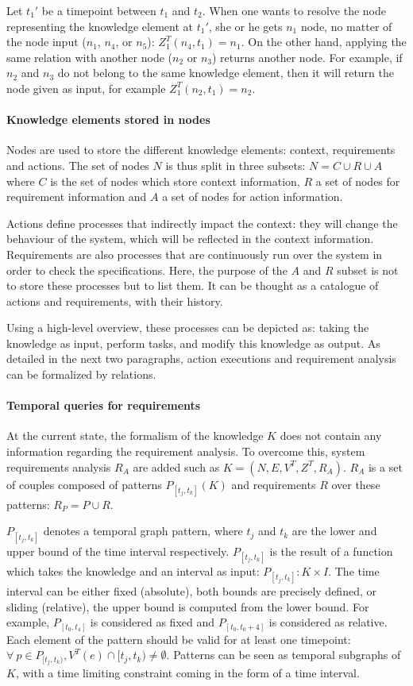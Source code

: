 Let $t_1'$ be a timepoint between $t_1$ and $t_2$.
When one wants to resolve the node representing the knowledge element at $t_1'$, she or he gets $n_1$ node, no matter of the node input ($n_1$, $n_4$, or $n_5$): $Z^{T}_1(n_4, t_1) = n_1$.
On the other hand, applying the same relation with another node ($n_2$ or $n_3$) returns another node.
For example, if $n_2$ and $n_3$ do not belong to the same knowledge element, then it will return the node given as input, for example $Z^{T}_1(n_2, t_1) = n_2$.

\paragraph{Knowledge elements stored in nodes}
Nodes are used to store the different knowledge elements: context, requirements and actions.
The set of nodes $N$ is thus split in three subsets: $N = C \cup R \cup A$ where $C$ is the set of nodes which store context information, $R$ a set of nodes for requirement information and $A$ a set of nodes for action information.

Actions define processes that indirectly impact the context: they will change the behaviour of the system, which will be reflected in the context information.
Requirements are also processes that are continuously run over the system in order to check the specifications.
Here, the purpose of the $A$ and $R$ subset is not to store these processes but to list them.
It can be thought as a catalogue of actions and requirements, with their history.

Using a high-level overview, these processes can be depicted as: taking the knowledge as input, perform tasks, and modify this knowledge as output.
As detailed in the next two paragraphs, action executions and requirement analysis can be formalized by relations.

\paragraph{Temporal queries for requirements}
At the current state, the formalism of the knowledge $K$ does not contain any information regarding the requirement analysis.
To overcome this, system requirements analysis $R_A$ are added such as $K = (N, E, V^T, Z^T, R_A)$.
$R_A$ is a set of couples composed of patterns $P_{[t_j,t_k]}(K)$ and requirements $R$ over these patterns: $R_P = {P \cup R}$. 

$P_{[t_j, t_k]}$ denotes a temporal graph pattern, where $t_j$ and $t_k$ are the lower and upper bound of the time interval respectively.
$P_{[t_j, t_k]}$ is the result of a function which takes the knowledge and an interval as input: $P_{[t_j, t_k]} : K \times I$.
The time interval can be either fixed (absolute), \ie both bounds are precisely defined, or sliding (relative), \ie the upper bound is computed from the lower bound.
For example, $P_{[t_0, t_4]}$ is considered as fixed and $P_{[t_0, t_0+4]}$ is considered as relative.
Each element of the pattern should be valid for at least one timepoint: $\forall~p \in P_{[t_j,t_k)}, V^T(e) \cap [t_j,t_k) \neq \emptyset$.
Patterns can be seen as temporal subgraphs of $K$, with a time limiting constraint coming in the form of a time interval.

